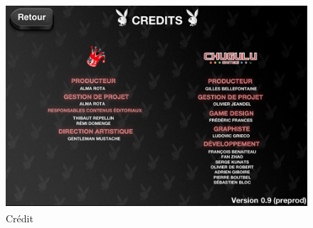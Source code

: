 \documentclass[twoside, UTF8]{EPURapport}
\begin{document}
\begin{figure}[htbp]
	\centering
		\includegraphics[height=3in]{Image/Capture4.png}
	\caption{Crédit}
	\label{fig:Image_Capture4}
\end{figure}
\end{document}
